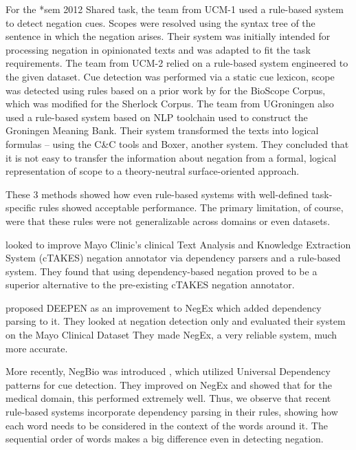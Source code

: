 \documentclass[10pt, a4paper]{article}
\begin{document}
\par For the *sem 2012 Shared task, the team from UCM-1 \cite{carrillo-de-albornoz-etal-2012-ucm} used a rule-based system to detect negation cues. Scopes were resolved using the syntax tree of the sentence in which the negation arises. Their system was initially intended for processing negation in opinionated texts and was adapted to fit the task requirements. The team from UCM-2 \cite{ballesteros-etal-2012-ucm} relied on a rule-based system engineered to the given dataset. Cue detection was performed via a static cue lexicon, scope was detected using rules based on a prior work by  for the BioScope Corpus, which was modified for the Sherlock Corpus. The team from UGroningen \cite{basile-etal-2012-ugroningen} also used a rule-based system based on NLP toolchain used to construct the Groningen Meaning Bank. Their system transformed the texts into logical formulas – using the C\&C tools and Boxer, another system. They concluded that it is not easy to transfer the information about negation from a formal, logical representation of scope to a theory-neutral surface-oriented approach.
\par These 3 methods showed how even rule-based systems with well-defined task-specific rules showed acceptable performance. The primary limitation, of course, were that these rules were not generalizable across domains or even datasets.
\par {} looked to improve Mayo Clinic’s clinical Text Analysis and Knowledge Extraction System (cTAKES) negation annotator via dependency parsers and a rule-based system. They found that using dependency-based negation proved to be a superior alternative to the pre-existing cTAKES negation annotator.
\par {} proposed DEEPEN as an improvement to NegEx which added dependency parsing to it. They looked at negation detection only and evaluated their system on the Mayo Clinical Dataset They made NegEx, a very reliable system, much more accurate.
\par More recently, NegBio was introduced \cite{peng}, which utilized Universal Dependency patterns for cue detection. They improved on NegEx and showed that for the medical domain, this performed extremely well. Thus, we observe that recent rule-based systems incorporate dependency parsing in their rules, showing how each word needs to be considered in the context of the words around it. The sequential order of words makes a big difference even in detecting negation.
\end{document}
